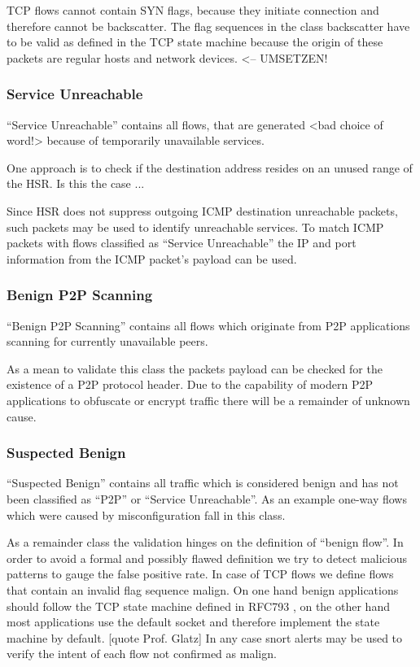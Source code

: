\documentclass[a4paper]{scrartcl}
\begin{document}
TCP flows cannot contain SYN flags, because they initiate connection and therefore cannot be backscatter. The flag sequences in the class backscatter have to be valid as defined in the TCP state machine \cite{rfc_tcp} because the origin of these packets are regular hosts and network devices. <-- UMSETZEN!

\subsubsection{Service Unreachable}
``Service Unreachable'' contains all flows, that are generated <bad choice of word!> because of temporarily unavailable services.

One approach is to check if the destination address resides on an unused range of the HSR. Is this the case ...

Since\cite{rfc_icmp} HSR does not suppress outgoing ICMP destination unreachable packets, such packets may be used to identify unreachable services. To match ICMP packets with flows classified as ``Service Unreachable'' the IP and port information from the ICMP packet's payload \cite{rfc_icmp} can be used. 

\subsubsection{Benign P2P Scanning}
``Benign P2P Scanning'' contains all flows which originate from P2P applications scanning for currently unavailable peers.

As a mean to validate this class the packets payload can be checked for the existence of a P2P protocol header. Due to the capability of modern P2P applications to obfuscate \cite{emule} or encrypt \cite{vuze} traffic there will be a remainder of unknown cause.

\subsubsection{Suspected Benign}
``Suspected Benign'' contains all traffic which is considered benign and has not been classified as ``P2P'' or ``Service Unreachable''. As an example one-way flows which were caused by misconfiguration fall in this class.

As a remainder class the validation hinges on the definition of ``benign flow''. 
In order to avoid a formal and possibly flawed definition we try to detect malicious patterns to gauge the false positive rate.
In case of TCP flows we define flows that contain an invalid flag sequence malign. On one hand benign applications should follow the TCP state machine defined in RFC793 \cite{rfc_tcp}, on the other hand most applications use the default socket and therefore implement the state machine by default. [quote Prof. Glatz]
In any case snort alerts may be used to verify the intent of each flow not confirmed as malign.
\end{document}
